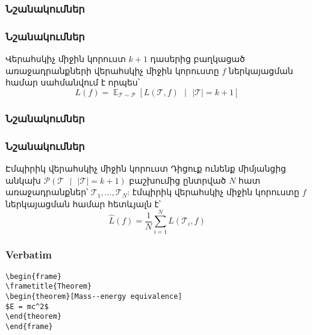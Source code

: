 \documentclass[10pt]{beamer}
\DeclareMathOperator*{\E}{\mathbb{E}}
\begin{document}
\begin{frame}
\frametitle{\armfont Նշանակումներ}
\end{frame}


\begin{frame}
\frametitle{\armfont Նշանակումներ}

\begin{block}{\armfont Վերահսկիչ միջին կորուստ}
\armfont \fontsize{8pt}{8pt}
$k+1$ դասերից բաղկացած առաջադրանքների վերահսկիչ միջին կորուստը $f$ ներկայացման համար սահմանվում է որպես՝ 
$$L(f) = \E_{\mathcal{T} \sim \mathcal{P}} \left [L (\mathcal{T}, f) \text{ } | \text{ } |\mathcal{T}| = k+1\right]$$
\end{block}

\end{frame}

\begin{frame}
\frametitle{\armfont Նշանակումներ}
\end{frame}

\begin{frame}
\frametitle{\armfont Նշանակումներ}

\begin{block}{\armfont Էմպիրիկ վերահսկիչ միջին կորուստ}
\armfont \fontsize{8pt}{8pt} Դիցուք ունենք միմյանցից անկախ $\mathcal{P}(\mathcal{T} \text{ } |\text{ }  |\mathcal{T}| = k +1)$ բաշխումից ընտրված $N$ հատ առաջադրանքներ՝ $\mathcal{T}_1, ..., \mathcal{T}_N$:
էմպիրիկ վերահսկիչ միջին կորուստը $f$ ներկայացման համար հետևյալն է՝ 
$$\hat{L}(f) = \frac{1}{N}\sum_{i=1}^{N}L (\mathcal{T}_i, f)$$
\end{block}

\end{frame}

\begin{frame}[fragile] %
\frametitle{Verbatim}
\begin{example}
\begin{verbatim}
\begin{frame}
\frametitle{Theorem}
\begin{theorem}[Mass--energy equivalence]
$E = mc^2$
\end{theorem}
\end{frame}\end{verbatim}
\end{example}
\end{frame}

\iffalse
\end{document}
